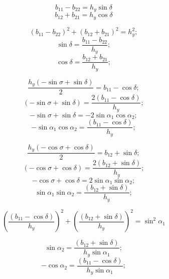 $$b_{11} - b_{22} = {h_y}\sin\delta  $$
$$b_{12} + b_{21} = {h_y}\cos\delta  $$

$$\left(b_{11} - b_{22}\right)^2 + \left(b_{12} + b_{21}\right)^2 = h_y^2;$$
$$\sin\delta = \frac{b_{11} - b_{22}}{h_y};$$
$$\cos\delta = \frac{b_{12} + b_{21}}{h_y};$$

$$\frac{{h_y} (-\sin\sigma + \sin\delta)}{2} = b_{11} - \cos\delta;$$
$$(-\sin\sigma + \sin\delta) = \frac{2(b_{11} - \cos\delta)}{h_y};$$
$$-\sin\sigma + \sin\delta = -2\sin\alpha_1 \cos\alpha_2;$$
$$-\sin\alpha_1 \cos\alpha_2 = \frac{(b_{11} - \cos\delta)}{h_y};$$

$$\frac{{h_y} (-\cos\sigma + \cos\delta)}{2} = b_{12} + \sin\delta;$$
$$(-\cos\sigma + \cos\delta) = \frac{2(b_{12} + \sin\delta)}{h_y};$$
$$-\cos\sigma + \cos\delta =  2\sin\alpha_1 \sin\alpha_2;$$
$$ \sin\alpha_1 \sin\alpha_2 = \frac{(b_{12} + \sin\delta)}{h_y};$$

$$
\left( \frac{(b_{11} - \cos\delta)}{h_y} \right)^2
+
\left( \frac{(b_{12} + \sin\delta)}{h_y} \right)^2
= \sin^2 \alpha_1
$$

$$ \sin\alpha_2 = \frac{(b_{12} + \sin\delta)}{h_y \sin\alpha_1};$$
$$-\cos\alpha_2 = \frac{(b_{11} - \cos\delta)}{h_y \sin\alpha_1};$$
